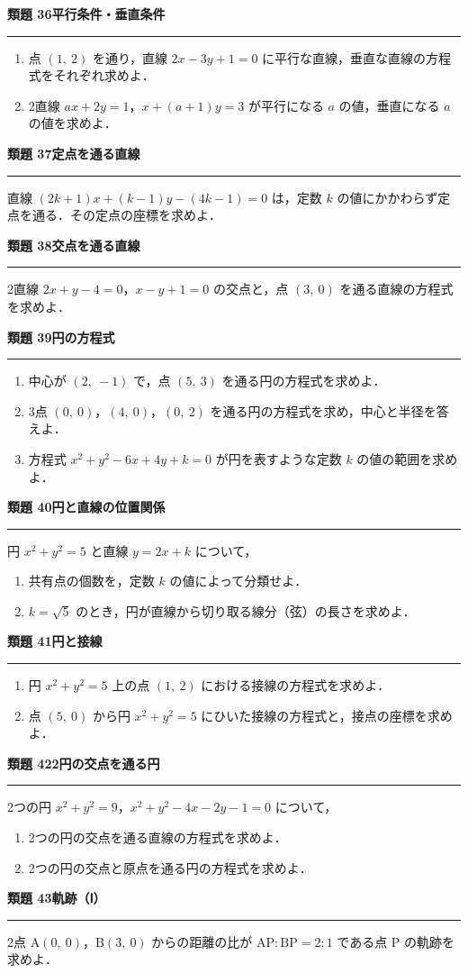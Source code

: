 \documentclass[a4paper,11pt]{ltjsarticle}
\newcommand{\mon}[2]{\Needspace{7\baselineskip}\vspace{10pt}%
  {\sffamily\bfseries 類題 #1\quad #2\par}\vspace{2pt}\hrule\vspace{4pt}}
\begin{document}
\mon{36}{平行条件・垂直条件}
\begin{enumerate}
\item 点 $(1,\ 2)$ を通り，直線 $2x-3y+1=0$ に平行な直線，垂直な直線の方程式をそれぞれ求めよ．
\item 2直線 $ax+2y=1$，$x+(a+1)y=3$ が平行になる $a$ の値，垂直になる $a$ の値を求めよ．
\end{enumerate}

\mon{37}{定点を通る直線}
直線 $(2k+1)x+(k-1)y-(4k-1)=0$ は，定数 $k$ の値にかかわらず定点を通る．その定点の座標を求めよ．

\mon{38}{交点を通る直線}
2直線 $2x+y-4=0$，$x-y+1=0$ の交点と，点 $(3,\ 0)$ を通る直線の方程式を求めよ．

\mon{39}{円の方程式}
\begin{enumerate}
\item 中心が $(2,\ -1)$ で，点 $(5,\ 3)$ を通る円の方程式を求めよ．
\item 3点 $(0,\ 0)$，$(4,\ 0)$，$(0,\ 2)$ を通る円の方程式を求め，中心と半径を答えよ．
\item 方程式 $x^2+y^2-6x+4y+k=0$ が円を表すような定数 $k$ の値の範囲を求めよ．
\end{enumerate}

\mon{40}{円と直線の位置関係}
円 $x^2+y^2=5$ と直線 $y=2x+k$ について，
\begin{enumerate}
\item 共有点の個数を，定数 $k$ の値によって分類せよ．
\item $k=\sqrt5$ のとき，円が直線から切り取る線分（弦）の長さを求めよ．
\end{enumerate}

\mon{41}{円と接線}
\begin{enumerate}
\item 円 $x^2+y^2=5$ 上の点 $(1,\ 2)$ における接線の方程式を求めよ．
\item 点 $(5,\ 0)$ から円 $x^2+y^2=5$ にひいた接線の方程式と，接点の座標を求めよ．
\end{enumerate}

\mon{42}{2円の交点を通る円}
2つの円 $x^2+y^2=9$，$x^2+y^2-4x-2y-1=0$ について，
\begin{enumerate}
\item 2つの円の交点を通る直線の方程式を求めよ．
\item 2つの円の交点と原点を通る円の方程式を求めよ．
\end{enumerate}

\mon{43}{軌跡（Ⅰ）}
2点 $\mathrm A(0,\ 0)$，$\mathrm B(3,\ 0)$ からの距離の比が $\mathrm{AP}:\mathrm{BP}=2:1$ である点 P の軌跡を求めよ．
\end{document}
